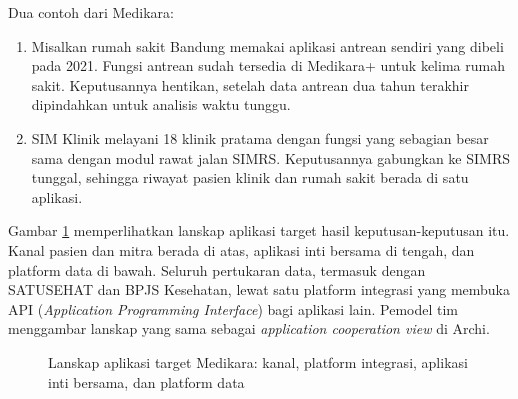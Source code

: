 Dua contoh dari Medikara:
\begin{enumerate}
  \item Misalkan rumah sakit Bandung memakai aplikasi antrean sendiri yang dibeli
        pada 2021. Fungsi antrean sudah tersedia di Medikara+ untuk kelima
        rumah sakit. Keputusannya hentikan, setelah data antrean dua tahun
        terakhir dipindahkan untuk analisis waktu tunggu.
  \item SIM Klinik melayani 18 klinik pratama dengan fungsi yang sebagian
        besar sama dengan modul rawat jalan SIMRS. Keputusannya gabungkan ke
        SIMRS tunggal, sehingga riwayat pasien klinik dan rumah sakit berada
        di satu aplikasi.
\end{enumerate}

Gambar \ref{fig:ch09-lanskap-aplikasi-target} memperlihatkan lanskap
aplikasi target hasil keputusan-keputusan itu. Kanal pasien dan mitra berada
di atas, aplikasi inti bersama di tengah, dan platform data di bawah. Seluruh
pertukaran data, termasuk dengan SATUSEHAT dan BPJS Kesehatan, lewat satu
platform integrasi yang membuka API (\textit{Application Programming
Interface}) bagi aplikasi lain. Pemodel tim menggambar lanskap yang sama sebagai
\textit{application cooperation view} di Archi.

\begin{figure}[!htb]
  \centering
  
  \caption{Lanskap aplikasi target Medikara: kanal, platform integrasi,
           aplikasi inti bersama, dan platform data}
  \label{fig:ch09-lanskap-aplikasi-target}
\end{figure}

